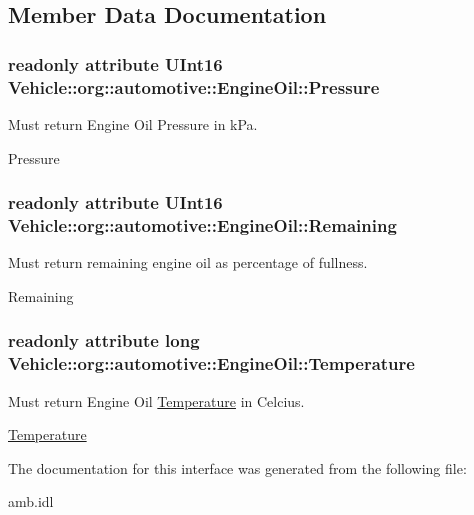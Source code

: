 \subsection{Member Data Documentation}
\hypertarget{interfaceVehicle_1_1org_1_1automotive_1_1EngineOil_a3f1ce0b704bc925d9a4cc6e49251c77d}{
\subsubsection[{Pressure}]{\setlength{\rightskip}{0pt plus 5cm}readonly attribute U\-Int16 Vehicle\-::org\-::automotive\-::\-Engine\-Oil\-::\-Pressure}}\label{interfaceVehicle_1_1org_1_1automotive_1_1EngineOil_a3f1ce0b704bc925d9a4cc6e49251c77d}


Must return Engine Oil Pressure in k\-Pa. 

Pressure \hypertarget{interfaceVehicle_1_1org_1_1automotive_1_1EngineOil_ae125deb8dab3cc33f61691de8d3e9c37}{
\subsubsection[{Remaining}]{\setlength{\rightskip}{0pt plus 5cm}readonly attribute U\-Int16 Vehicle\-::org\-::automotive\-::\-Engine\-Oil\-::\-Remaining}}\label{interfaceVehicle_1_1org_1_1automotive_1_1EngineOil_ae125deb8dab3cc33f61691de8d3e9c37}


Must return remaining engine oil as percentage of fullness. 

Remaining \hypertarget{interfaceVehicle_1_1org_1_1automotive_1_1EngineOil_a9f285574ac7c85dcd5607de88be54187}{
\subsubsection[{Temperature}]{\setlength{\rightskip}{0pt plus 5cm}readonly attribute long Vehicle\-::org\-::automotive\-::\-Engine\-Oil\-::\-Temperature}}\label{interfaceVehicle_1_1org_1_1automotive_1_1EngineOil_a9f285574ac7c85dcd5607de88be54187}


Must return Engine Oil \hyperlink{interfaceVehicle_1_1org_1_1automotive_1_1Temperature}{Temperature} in Celcius. 

\hyperlink{interfaceVehicle_1_1org_1_1automotive_1_1Temperature}{Temperature} 

The documentation for this interface was generated from the following file\-:\begin{DoxyCompactItemize}
\item 
amb.\-idl\end{DoxyCompactItemize}
